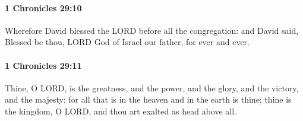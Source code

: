 		\paragraph{1 Chronicles 29:10} %
			\label{1CHRONICLES-29-10}

			Wherefore David blessed the LORD before all the congregation: and David said, Blessed be thou, LORD God of Israel our father, for ever and ever.


		\paragraph{1 Chronicles 29:11} %
			\label{1CHRONICLES-29-11}

			Thine, O LORD, is the greatness, and the power, and the glory, and the victory, and the majesty: for all that is in the heaven and in the earth is thine; thine is the kingdom, O LORD, and thou art exalted as head above all.

